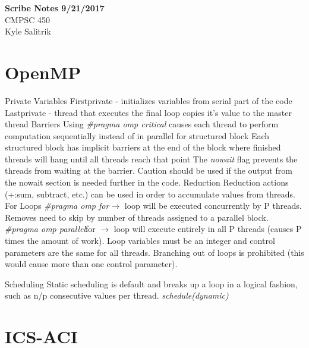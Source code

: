 \documentclass[a4paper, 11pt]{article}
\begin{document}
\graphicspath{{./figures/}}
\noindent
\large\textbf{Scribe Notes 9/21/2017} \\
\normalsize CMPSC 450\\
\large{Kyle Salitrik} \hfill 

\section*{OpenMP}

\begin{outline}
	\1 Private Variables
		\2 Firstprivate - initializes variables from serial part of the code
		\2 Lastprivate - thread that executes the final loop copies it's value to the master thread
	\1 Barriers 
		\2 Using \textit{\#pragma omp critical} causes each thread to perform computation sequentially instead of in parallel for structured block
		\2 Each structured block has implicit barriers at the end of the block where finished threads will hang until all threads reach that point
		\2 The \textit{nowait} flag prevents the threads from waiting at the barrier. Caution should be used if the output from the nowait section is needed further in the code.
	\1 Reduction
		\2 Reduction actions (+:sum, subtract, etc.) can be used in order to accumulate values from threads.
	\1 For Loops
		\2 \textit{\#pragma omp for}$\rightarrow$ loop will be executed concurrently by P threads. Removes need to skip by number of threads assigned to a parallel block.
		\2 \textit{\#pragma omp parallel}for $\rightarrow$ loop will execute entirely in all P threads (causes P times the amount of work).
		\2 Loop variables must be an integer and control parameters are the same for all threads.
		\2 Branching out of loops is prohibited (this would cause more than one control parameter).
	
	\1 Scheduling
		\2 Static scheduling is default and breaks up a loop in a logical fashion, such as n/p consecutive values per thread.
		\2 \textit{schedule(dynamic)} 
		
\end{outline}

\section*{ICS-ACI}
\end{document}
